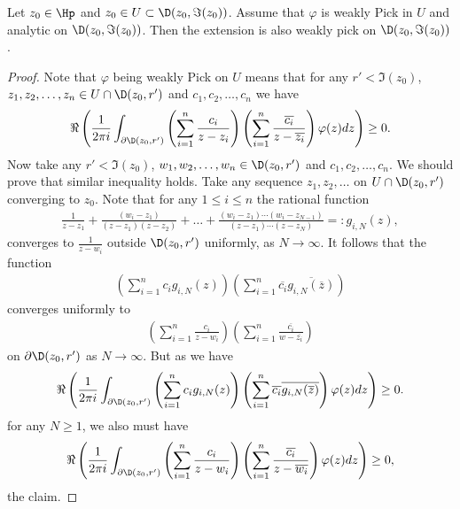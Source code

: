 \begin{lem}\label{disc_open_pick_lemma}
	Let $z_{0} \in \Hp$ and $z_{0} \in U \subset \D(z_{0}, \Im(z_{0}))$. Assume that $\varphi$ is weakly Pick in $U$ and analytic on $\D(z_{0}, \Im(z_{0}))$. Then the extension is also weakly pick on $\D(z_{0}, \Im(z_{0}))$.
\end{lem}
\begin{proof}
	Note that $\varphi$ being weakly Pick on $U$ means that for any $r' < \Im(z_{0})$, $z_{1}, z_{2}, \ldots, z_{n} \in U \cap \D(z_{0}, r')$ and $c_{1}, c_{2}, \ldots, c_{n}$ we have
	\begin{align*}
		\Re\left(\frac{1}{2 \pi i} \int_{\partial \D(z_{0}, r')}\left(\sum_{i = 1}^{n} \frac{c_{i}}{z - z_{i}}\right) \left(\sum_{i = 1}^{n} \frac{\overline{c_{i}}}{z - \overline{z_{i}}}\right) \varphi(z) dz\right) \geq 0.
	\end{align*}
	Now take any $r' < \Im(z_{0})$, $w_{1}, w_{2}, \ldots, w_{n} \in \D(z_{0}, r')$ and $c_{1}, c_{2}, \ldots, c_{n}$. We should prove that similar inequality holds. Take any sequence $z_{1}, z_{2}, \ldots$ on $U \cap \D(z_{0}, r')$ converging to $z_{0}$. Note that for any $1 \leq i \leq n$ the rational function
	\begin{align*}
		\frac{1}{z - z_{1}} + \frac{(w_{i} - z_{1})}{(z - z_{1}) (z - z_{2})} + \ldots + \frac{(w_{i} - z_{1})\cdots (w_{i} - z_{N - 1})}{(z - z_{1})\cdots (z - z_{N})} =: g_{i, N}(z),
	\end{align*}
	converges to $\frac{1}{z - w_{i}}$ outside $\D(z_{0}, r')$ uniformly, as $N \to \infty$. It follows that the function
	\begin{align*}
		\left(\sum_{i = 1}^{n} c_{i} g_{i, N}(z) \right) \left(\sum_{i = 1}^{n} \overline{c_{i}} \overline{g_{i, N}(\overline{z})} \right)
	\end{align*}
	converges uniformly to
	\begin{align*}
		\left(\sum_{i = 1}^{n} \frac{c_{i}}{z - w_{i}}\right) \left(\sum_{i = 1}^{n} \frac{\overline{c_{i}}}{w - \overline{z_{i}}}\right)
	\end{align*}
	on $\partial \D(z_{0}, r')$ as $N \to \infty$. But as we have
	\begin{align*}
		\Re\left(\frac{1}{2 \pi i} \int_{\partial \D(z_{0}, r')}\left(\sum_{i = 1}^{n} c_{i} g_{i, N}(z) \right) \left(\sum_{i = 1}^{n} \overline{c_{i}} \overline{g_{i, N}(\overline{z})} \right) \varphi(z) dz\right) \geq 0.
	\end{align*}
	for any $N \geq 1$, we also must have
	\begin{align*}
		\Re\left(\frac{1}{2 \pi i} \int_{\partial \D(z_{0}, r')}\left(\sum_{i = 1}^{n} \frac{c_{i}}{z - w_{i}}\right) \left(\sum_{i = 1}^{n} \frac{\overline{c_{i}}}{z - \overline{w_{i}}}\right) \varphi(z) dz\right) \geq 0,
	\end{align*}
	the claim.
\end{proof}

